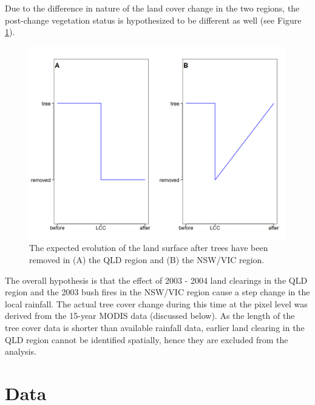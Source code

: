 \documentclass[fleqn,10pt,lineno]{wlpeerj} %
\theoremstyle{definition}
\theoremstyle{definition}
\theoremstyle{definition}
\theoremstyle{remark}
\begin{document}
Due to the difference in nature of the land cover change in the two
regions, the post-change vegetation status is hypothesized to be
different as well (see Figure \ref{fig:figure3-tc-simple}).

\begin{figure}
\includegraphics[width=0.7\linewidth]{figures/Fig3} \caption{The expected evolution of the land surface after trees have been removed in (A) the QLD region and (B) the NSW/VIC region.}\label{fig:figure3-tc-simple}
\end{figure}

The overall hypothesis is that the effect of 2003 - 2004 land clearings
in the QLD region and the 2003 bush fires in the NSW/VIC region cause a
step change in the local rainfall. The actual tree cover change during
this time at the pixel level was derived from the 15-year MODIS data
(discussed below). As the length of the tree cover data is shorter than
available rainfall data, earlier land clearing in the QLD region cannot
be identified spatially, hence they are excluded from the analysis.

\hypertarget{Data}{\section{Data}\label{Data}}
\end{document}
